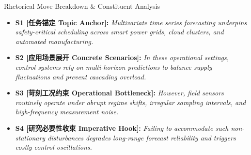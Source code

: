 \begin{TipBox}{Rhetorical Move Breakdown \& Constituent Analysis}
\begin{itemize}[leftmargin=1.5em]
  \item \textbf{S1 [任务锚定 Topic Anchor]:} \textit{Multivariate time series forecasting underpins safety-critical scheduling across smart power grids, cloud clusters, and automated manufacturing.}\par{}
  \item \textbf{S2 [应用场景展开 Concrete Scenarios]:} \textit{In these operational settings, control systems rely on multi-horizon predictions to balance supply fluctuations and prevent cascading overload.}\par{}
  \item \textbf{S3 [苛刻工况约束 Operational Bottleneck]:} \textit{However, field sensors routinely operate under abrupt regime shifts, irregular sampling intervals, and high-frequency measurement noise.}\par{}
  \item \textbf{S4 [研究必要性收束 Imperative Hook]:} \textit{Failing to accommodate such non-stationary disturbances degrades long-range forecast reliability and triggers costly control oscillations.}\par{}
\end{itemize}
\end{TipBox}
\medskip
